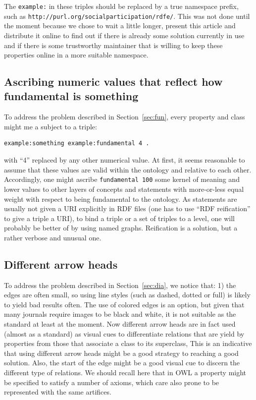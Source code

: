\documentclass[12pt,fleqn]{article}
\begin{document}
The \texttt{example:} in these triples should be replaced by a true namespace prefix, such
as \texttt{http://purl.org/socialparticipation/rdfe/}.
This was not done until the moment because we chose to wait a little longer,
present this article and distribute it online to find out if there is already some
solution currently in use and if there is some trustworthy maintainer that is willing
to keep these properties online in a more suitable namespace.

\subsection{Ascribing numeric values that reflect how fundamental is something}\label{sec:props}
To address the problem described in Section~\ref{sec:fun},
every property and class might me a subject to a triple:
\begin{Verbatim}[fontsize=\footnotesize]
	example:something example:fundamental 4 .
\end{Verbatim}
\noindent with ``4'' replaced by any other numerical value.
At first, it seems reasonable to assume that these values are
valid within the ontology and relative to each other.
Accordingly, one might ascribe \texttt{fundamental 100}
some kernel of meaning and lower values to other layers of
concepts and statements with more-or-less equal weight with respect
to being fundamental to the ontology.
As statements are usually not given a URI explicitly
in RDF files (one has to use ``RDF reification'' to give a triple a URI),
to bind a triple or a set of triples to a level,
one will probably be better of by using named graphs.
Reification is a solution, but a rather verbose and unusual one.

\subsection{Different arrow heads}
To address the problem described in Section~\ref{sec:dia},
we notice that: 1) the edges are often small, so using line styles
(such as dashed, dotted or full) is likely to yield bad results often.
The use of colored edges is an option, but given that many
journals require images to be black and white, it is not suitable
as the standard at least at the moment.
Now different arrow heads are in fact used (almost as a standard) 
as visual cues
to differentiate relations that are yield by properties from those
that associate a class to its superclass,
This is an indicative that using different arrow heads might
be a good strategy to reaching a good solution.
Also, the start of the edge might be a good visual cue to
discern the different type of relations.
We should recall here that in OWL a property might be specified to
satisfy a number of axioms, which care also prone to be represented
with the same artifices.
\end{document}
